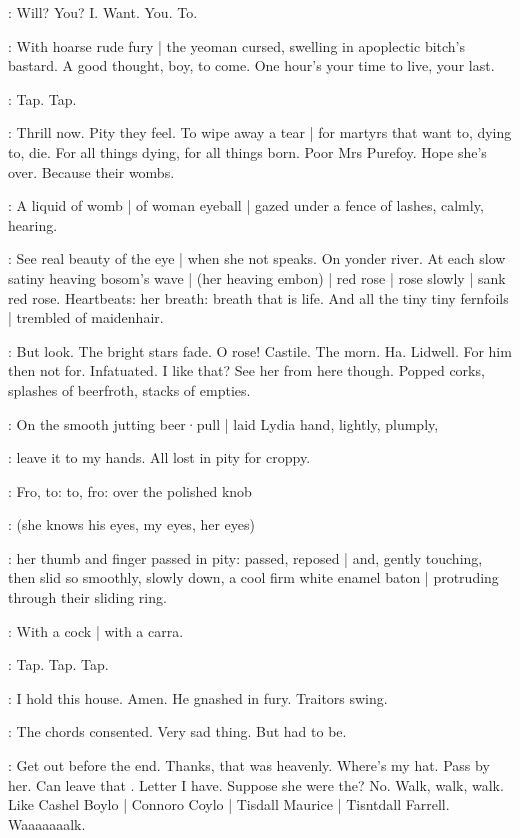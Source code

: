 \BloomIntB:
Will?
You?
I\@.
Want.
You.
To.

:
With hoarse rude fury |
the yeoman cursed,
swelling in apoplectic bitch's bastard.
A good thought,
boy,
to come.
One hour's your time to live,
your last.

\stripling:
Tap.
Tap.

\BloomIntB:
Thrill now.
Pity they feel.
To wipe away a tear |
for martyrs that want to,
dying to,
die.
For all things dying,
for all things born.
Poor Mrs Purefoy.
Hope she's over.
Because their wombs.

:
A liquid of womb |
of woman eyeball |
gazed under a fence of lashes,
calmly,
hearing.

\BloomIntA:
See real beauty of the eye |
when she not speaks.
On yonder river.
At each slow satiny heaving bosom's wave |
(her heaving embon) |
red rose |
rose slowly |
sank red rose.
Heartbeats:
her breath:
breath that is life.
And all the tiny tiny fernfoils |
trembled of maidenhair.

\BloomIntA:
But look.
The bright stars fade.
O rose!
Castile.
The morn.
Ha.
Lidwell.
For him then not for.
Infatuated.
I like that?
See her from here though.
Popped corks,
splashes of beerfroth,
stacks of empties.

:
On the smooth jutting beer·pull |
laid Lydia hand,
lightly,
plumply,

\BloomIntA:
leave it to my hands.
All lost in pity for croppy.

:
Fro,
to:
to,
fro:
over the polished knob

\BloomIntA:
(she knows his eyes,
my eyes,
her eyes)

:
her thumb and finger passed in pity:
passed,
reposed |
and, gently touching,
then slid so smoothly,
slowly down,
a cool firm white enamel baton |
protruding through their sliding ring.

\BloomIntB:
With a cock |
with a carra.

\stripling:
Tap.
Tap.
Tap.

:
I hold this house.
Amen.
He gnashed in fury.
Traitors swing.

:
The chords consented.
Very sad thing.
But had to be.

\BloomIntA:
Get out before the end.
Thanks,
that was heavenly.
Where's my hat.
Pass by her.
Can leave that .
Letter I have.
Suppose she were the?
No.
Walk,
walk,
walk.
Like Cashel Boylo |
Connoro Coylo |
Tisdall Maurice |
Tisntdall Farrell.
Waaaaaaalk.


